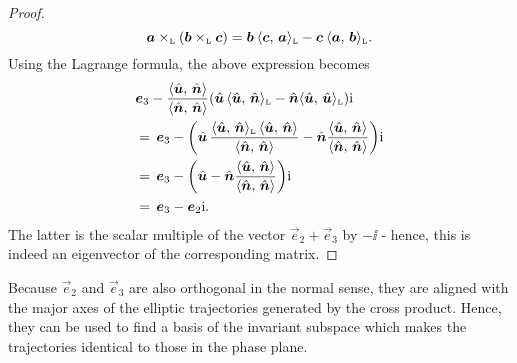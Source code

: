 \begin{proof}
    $$ 
        \lorcrossp{\vec{a}}{\qty(\lorcrossp{\vec{b}}{\vec{c}})} 
       = \vec{b}\:\lorinner{\vec{c}}{\vec{a}} - \vec{c}\:\lorinner{\vec{a}}{\vec{b}}. 
    $$
Using the Lagrange formula, the above expression becomes
    \begin{equation*}
        \begin{split}
            & \vec{e}_3 - \frac{ \inner{\uvec{u}}{\uvec{n}} }{ \inner{\uvec{n}}{\uvec{n}} }\qty(\uvec{u}\,\lorinner{\uvec{u}}{\uvec{n}} - \uvec{n}\lorinner{\uvec{u}}{\uvec{u}})\ii \\
            & =\, \vec{e}_3 - \qty(\uvec{u}\,\frac{ \lorinner{\uvec{u}}{\uvec{n}} \, \inner{\uvec{u}}{\uvec{n}} }{ \inner{\uvec{n}}{\uvec{n}} } - \uvec{n}\frac{ \inner{\uvec{u}}{\uvec{n}} }{ \inner{\uvec{n}}{\uvec{n}} })\ii \\
            & =\, \vec{e}_3 - \qty(\uvec{u} - \uvec{n}\frac{ \inner{\uvec{u}}{\uvec{n}} }{ \inner{\uvec{n}}{\uvec{n}} })\ii \\
            & =\, \vec{e}_3 - \vec{e}_2\ii. 
        \end{split}
    \end{equation*}
    The latter is the scalar multiple of the vector $\vec{e}_2 + \vec{e}_3$ by $-\ii$ - hence, this is indeed an eigenvector of the corresponding matrix.
\end{proof}
Because $\vec{e}_2$ and $\vec{e}_3$ are also orthogonal in the normal sense, they are aligned with the major axes of the elliptic trajectories generated by the cross product. Hence, they can be used to find a basis of the invariant subspace which makes the trajectories identical to those in the phase plane.


